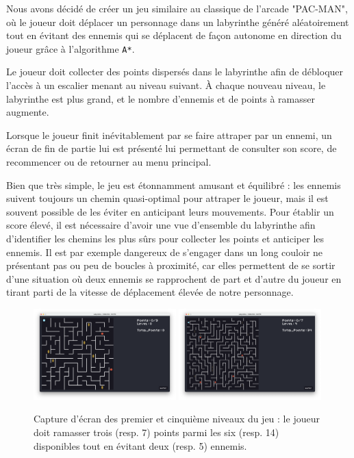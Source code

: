 \documentclass[12pt]{scrreprt} %
\begin{document}
Nous avons décidé de créer un jeu similaire au classique de l'arcade "PAC-MAN", où le joueur doit déplacer un personnage dans un labyrinthe généré aléatoirement tout en évitant des ennemis qui se déplacent de façon autonome en direction du joueur grâce à l'algorithme \texttt{A*}.




Le joueur doit collecter des points dispersés dans le labyrinthe afin de débloquer l'accès à un escalier menant au niveau suivant. À chaque nouveau niveau, le labyrinthe est plus grand, et le nombre d'ennemis et de points à ramasser augmente.

Lorsque le joueur finit inévitablement par se faire attraper par un ennemi, un écran de fin de partie lui est présenté lui permettant de consulter son score, de recommencer ou de retourner au menu principal.

Bien que très simple, le jeu est étonnamment amusant et équilibré : les ennemis suivent toujours un chemin quasi-optimal pour attraper le joueur, mais il est souvent possible de les éviter en anticipant leurs mouvements. Pour établir un score élevé, il est nécessaire d'avoir une vue d'ensemble du labyrinthe afin d'identifier les chemins les plus sûrs pour collecter les points et anticiper les ennemis. Il est par exemple dangereux de s'engager dans un long couloir ne présentant pas ou peu de boucles à proximité, car elles permettent de se sortir d'une situation où deux ennemis se rapprochent de part et d'autre du joueur en tirant parti de la vitesse de déplacement élevée de notre personnage.

\begin{figure}[h]
    \centering
    \includegraphics[width=0.49\textwidth]{images/gamelevel0.png}
    \includegraphics[width=0.49\textwidth]{images/gamelevel4.png}

    \caption{Capture d'écran des premier et cinquième niveaux du jeu : le joueur doit ramasser trois (resp. 7) points parmi les six (resp. 14) disponibles tout en évitant deux (resp. 5) ennemis.}
\end{figure}
\end{document}
